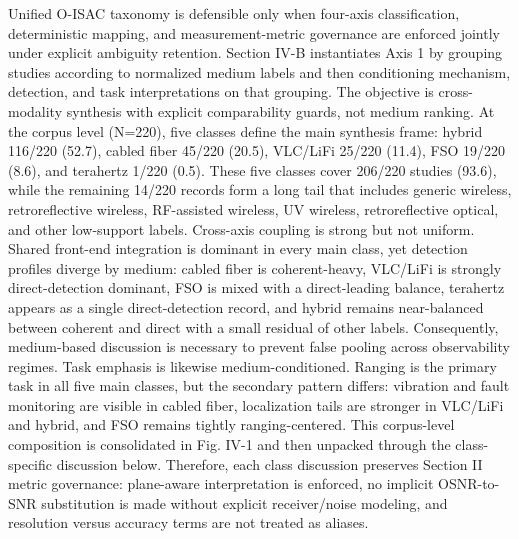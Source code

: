 {} Unified O-ISAC taxonomy is defensible only when four-axis classification, deterministic mapping, and measurement-metric governance are enforced jointly under explicit ambiguity retention.\markdownRendererInterblockSeparator
{}\markdownRendererThematicBreak{}\markdownRendererInterblockSeparator
{}
\markdownRendererSectionEnd 
\markdownRendererSectionEnd \markdownRendererSectionBegin
{}\markdownRendererInterblockSeparator
{}Section IV-B instantiates Axis 1 by grouping studies according to normalized medium labels and then conditioning mechanism, detection, and task interpretations on that grouping. The objective is cross-modality synthesis with explicit comparability guards, not medium ranking. At the corpus level (N=220), five classes define the main synthesis frame: hybrid 116/220 (52.7\markdownRendererPercentSign{}), cabled fiber 45/220 (20.5\markdownRendererPercentSign{}), VLC/LiFi 25/220 (11.4\markdownRendererPercentSign{}), FSO 19/220 (8.6\markdownRendererPercentSign{}), and terahertz 1/220 (0.5\markdownRendererPercentSign{}). These five classes cover 206/220 studies (93.6\markdownRendererPercentSign{}), while the remaining 14/220 records form a long tail that includes generic wireless, retroreflective wireless, RF-assisted wireless, UV wireless, retroreflective optical, and other low-support labels.\markdownRendererParagraphSeparator
{}Cross-axis coupling is strong but not uniform. Shared front-end integration is dominant in every main class, yet detection profiles diverge by medium: cabled fiber is coherent-heavy, VLC/LiFi is strongly direct-detection dominant, FSO is mixed with a direct-leading balance, terahertz appears as a single direct-detection record, and hybrid remains near-balanced between coherent and direct with a small residual of other labels. Consequently, medium-based discussion is necessary to prevent false pooling across observability regimes.\markdownRendererParagraphSeparator
{}Task emphasis is likewise medium-conditioned. Ranging is the primary task in all five main classes, but the secondary pattern differs: vibration and fault monitoring are visible in cabled fiber, localization tails are stronger in VLC/LiFi and hybrid, and FSO remains tightly ranging-centered. This corpus-level composition is consolidated in Fig. IV-1 and then unpacked through the class-specific discussion below. Therefore, each class discussion preserves Section II metric governance: plane-aware interpretation is enforced, no implicit OSNR-to-SNR substitution is made without explicit receiver/noise modeling, and resolution versus accuracy terms are not treated as aliases.\markdownRendererParagraphSeparator
